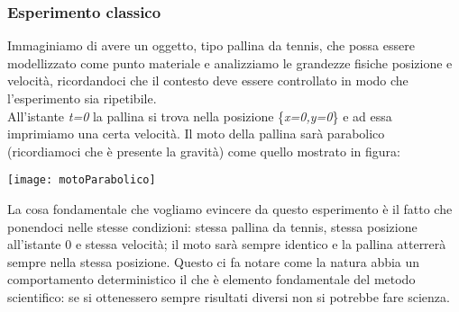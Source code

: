 \subsubsection{Esperimento classico}
Immaginiamo di avere un oggetto, tipo pallina da tennis, che possa essere modellizzato come punto materiale e analizziamo le grandezze fisiche posizione e velocità, ricordandoci che il contesto deve essere controllato in modo che l'esperimento sia ripetibile.\\
All'istante \textit{t=0} la pallina si trova nella posizione \{\textit{x=0,y=0}\} e ad essa imprimiamo una certa velocità. Il moto della pallina sarà parabolico (ricordiamoci che è presente la gravità) come quello mostrato in figura:\\
\begin{center}
\texttt{[image: motoParabolico]}
\end{center}
La cosa fondamentale che vogliamo evincere da questo esperimento è il fatto che ponendoci nelle stesse condizioni: stessa pallina da tennis, stessa posizione all'istante 0 e stessa velocità; il moto sarà sempre identico e la pallina atterrerà sempre nella stessa posizione. Questo ci fa notare come la natura abbia un comportamento deterministico il che è elemento fondamentale del metodo scientifico: se si ottenessero sempre risultati diversi non si potrebbe fare scienza.
